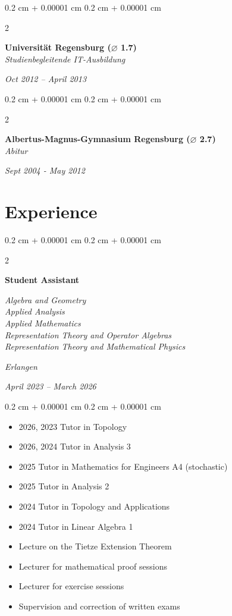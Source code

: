 \documentclass[10pt, letterpaper]{article}
\newenvironment{highlights}{
    \begin{itemize}[
        topsep=0.10 cm,
        parsep=0.10 cm,
        partopsep=0pt,
        itemsep=0pt,
        leftmargin=0.4 cm + 10pt
    ]
}{
    \end{itemize}
}
\newenvironment{onecolentry}{
    \begin{adjustwidth}{
        0.2 cm + 0.00001 cm
    }{
        0.2 cm + 0.00001 cm
    }
}{
    \end{adjustwidth}
}
\newenvironment{twocolentry}[2][]{
    \onecolentry
    \def\secondColumn{#2}
    \setcolumnwidth{\fill, 4.5 cm}
    \begin{paracol}{2}
}{
    \switchcolumn \raggedleft \secondColumn
    \end{paracol}
    \endonecolentry
}
\begin{document}
\vspace{0.10 cm}
\begin{twocolentry}{           
	\textit{Oct 2012 – April 2013}}
	\textbf{Universität Regensburg  ($\varnothing$ 1.7)} \\
	\textit{Studienbegleitende IT-Ausbildung}
\end{twocolentry}

\vspace{0.10 cm}
\begin{twocolentry}{           
	\textit{Sept 2004 - May 2012}}
	\textbf{Albertus-Magnus-Gymnasium Regensburg  ($\varnothing$ 2.7)} \\
	\textit{Abitur}
\end{twocolentry}



    
\section{Experience}
\begin{twocolentry}{
    \textit{Erlangen}    
    
    \textit{April 2023 – March 2026}}
    \textbf{Student Assistant}
    
    \textit{Algebra and Geometry \\ Applied Analysis \\ Applied Mathematics \\ Representation Theory and Operator Algebras \\ Representation Theory and Mathematical Physics}
\end{twocolentry}

\vspace{0.10 cm}
\begin{onecolentry}
	\begin{highlights}
        \item 2026, 2023 Tutor in Topology
        \item 2026, 2024 Tutor in Analysis 3
		\item 2025 Tutor in Mathematics for Engineers A4 (stochastic)
        \item 2025 Tutor in Analysis 2
        \item 2024 Tutor in Topology and Applications
        \item 2024 Tutor in Linear Algebra 1
        \item Lecture on the Tietze Extension Theorem
        \item Lecturer for mathematical proof sessions
        \item Lecturer for exercise sessions
        \item Supervision and correction of written exams
	\end{highlights}
\end{onecolentry}
\vspace{0.2 cm}
\end{document}
